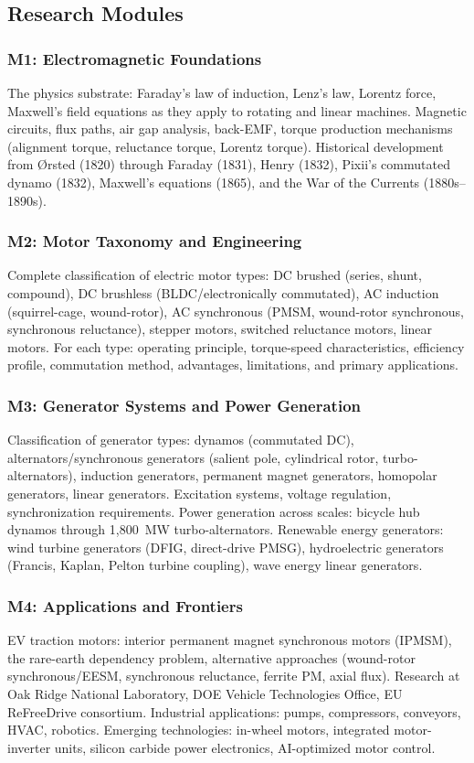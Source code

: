 \documentclass[11pt,letterpaper]{article}
\begin{document}
\subsection{Research Modules}

\subsubsection{M1: Electromagnetic Foundations}
The physics substrate: Faraday's law of induction, Lenz's law, Lorentz force, Maxwell's field equations as they apply to rotating and linear machines. Magnetic circuits, flux paths, air gap analysis, back-EMF, torque production mechanisms (alignment torque, reluctance torque, Lorentz torque). Historical development from \O rsted (1820) through Faraday (1831), Henry (1832), Pixii's commutated dynamo (1832), Maxwell's equations (1865), and the War of the Currents (1880s--1890s).

\subsubsection{M2: Motor Taxonomy and Engineering}
Complete classification of electric motor types: DC brushed (series, shunt, compound), DC brushless (BLDC/electronically commutated), AC induction (squirrel-cage, wound-rotor), AC synchronous (PMSM, wound-rotor synchronous, synchronous reluctance), stepper motors, switched reluctance motors, linear motors. For each type: operating principle, torque-speed characteristics, efficiency profile, commutation method, advantages, limitations, and primary applications.

\subsubsection{M3: Generator Systems and Power Generation}
Classification of generator types: dynamos (commutated DC), alternators/synchronous generators (salient pole, cylindrical rotor, turbo-alternators), induction generators, permanent magnet generators, homopolar generators, linear generators. Excitation systems, voltage regulation, synchronization requirements. Power generation across scales: bicycle hub dynamos through 1,800~MW turbo-alternators. Renewable energy generators: wind turbine generators (DFIG, direct-drive PMSG), hydroelectric generators (Francis, Kaplan, Pelton turbine coupling), wave energy linear generators.

\subsubsection{M4: Applications and Frontiers}
EV traction motors: interior permanent magnet synchronous motors (IPMSM), the rare-earth dependency problem, alternative approaches (wound-rotor synchronous/EESM, synchronous reluctance, ferrite PM, axial flux). Research at Oak Ridge National Laboratory, DOE Vehicle Technologies Office, EU ReFreeDrive consortium. Industrial applications: pumps, compressors, conveyors, HVAC, robotics. Emerging technologies: in-wheel motors, integrated motor-inverter units, silicon carbide power electronics, AI-optimized motor control.
\end{document}
